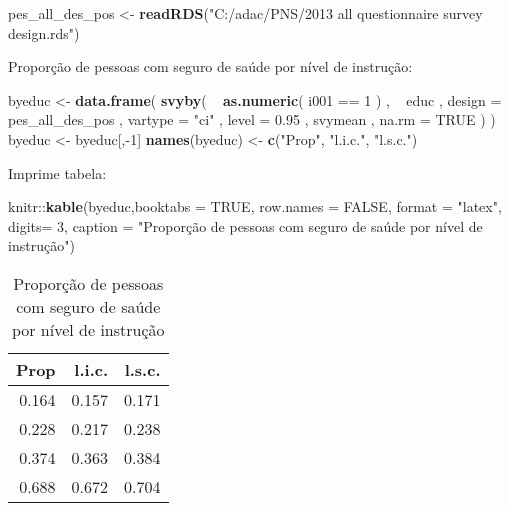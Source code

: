 \documentclass[]{book}
\newenvironment{Shaded}{\begin{snugshade}}{\end{snugshade}}
\newcommand{\KeywordTok}[1]{\textcolor[rgb]{0.13,0.29,0.53}{\textbf{{#1}}}}
\newcommand{\DataTypeTok}[1]{\textcolor[rgb]{0.13,0.29,0.53}{{#1}}}
\newcommand{\DecValTok}[1]{\textcolor[rgb]{0.00,0.00,0.81}{{#1}}}
\newcommand{\FloatTok}[1]{\textcolor[rgb]{0.00,0.00,0.81}{{#1}}}
\newcommand{\StringTok}[1]{\textcolor[rgb]{0.31,0.60,0.02}{{#1}}}
\newcommand{\OtherTok}[1]{\textcolor[rgb]{0.56,0.35,0.01}{{#1}}}
\newcommand{\NormalTok}[1]{{#1}}
\theoremstyle{definition}
\theoremstyle{definition}
\theoremstyle{remark}
\begin{document}
\begin{Shaded}
\begin{Highlighting}[]
\NormalTok{pes_all_des_pos <-}\StringTok{ }\KeywordTok{readRDS}\NormalTok{(}\StringTok{"C:/adac/PNS/2013 all questionnaire survey design.rds"}\NormalTok{)}
\end{Highlighting}
\end{Shaded}

Proporção de pessoas com seguro de saúde por nível de instrução:

\begin{Shaded}
\begin{Highlighting}[]
\NormalTok{byeduc <-}\StringTok{ }\KeywordTok{data.frame}\NormalTok{( }\KeywordTok{svyby}\NormalTok{( ~}\StringTok{ }\KeywordTok{as.numeric}\NormalTok{( i001 ==}\StringTok{ }\DecValTok{1} \NormalTok{) , ~}\StringTok{ }\NormalTok{educ ,}
\DataTypeTok{design =} \NormalTok{pes_all_des_pos , }\DataTypeTok{vartype =} \StringTok{"ci"} \NormalTok{,  }\DataTypeTok{level =} \FloatTok{0.95} \NormalTok{,}
\NormalTok{svymean , }\DataTypeTok{na.rm =} \OtherTok{TRUE} \NormalTok{) )}
\NormalTok{byeduc <-}\StringTok{ }\NormalTok{byeduc[,-}\DecValTok{1}\NormalTok{]}
\KeywordTok{names}\NormalTok{(byeduc) <-}\StringTok{ }\KeywordTok{c}\NormalTok{(}\StringTok{"Prop"}\NormalTok{, }\StringTok{"l.i.c."}\NormalTok{, }\StringTok{"l.s.c."}\NormalTok{)}
\end{Highlighting}
\end{Shaded}

Imprime tabela:

\begin{Shaded}
\begin{Highlighting}[]
\NormalTok{knitr::}\KeywordTok{kable}\NormalTok{(byeduc,}\DataTypeTok{booktabs =} \OtherTok{TRUE}\NormalTok{, }\DataTypeTok{row.names =} \OtherTok{FALSE}\NormalTok{, }\DataTypeTok{format =} \StringTok{"latex"}\NormalTok{, }
\DataTypeTok{digits=} \DecValTok{3}\NormalTok{, }\DataTypeTok{caption =} \StringTok{"Proporção de pessoas com seguro de saúde por nível }
\StringTok{de instrução"}\NormalTok{)}
\end{Highlighting}
\end{Shaded}

\begin{table}

\caption{\label{tab:unnamed-chunk-59}Proporção de pessoas com seguro de saúde por nível 
de instrução}
\centering
\begin{tabular}[t]{rrr}
\toprule
Prop & l.i.c. & l.s.c.\\
\midrule
0.164 & 0.157 & 0.171\\
0.228 & 0.217 & 0.238\\
0.374 & 0.363 & 0.384\\
0.688 & 0.672 & 0.704\\
\bottomrule
\end{tabular}
\end{table}
\end{document}
